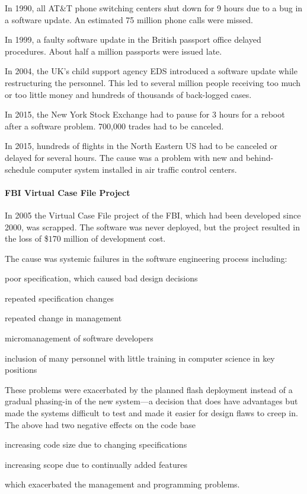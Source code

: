 In 1990, all AT\&T phone switching centers shut down for 9 hours due to a bug in a software update.
An estimated 75 million phone calls were missed.

In 1999, a faulty software update in the British passport office delayed procedures.
About half a million passports were issued late.

In 2004, the UK's child support agency EDS introduced a software update while restructuring the personnel.
This led to several million people receiving too much or too little money and hundreds of thousands of back-logged cases.

In 2015, the New York Stock Exchange had to pause for $3$ hours for a reboot after a software problem.
700,000 trades had to be canceled.

In 2015, hundreds of flights in the North Eastern US had to be canceled or delayed for several hours.
The cause was a problem with new and behind-schedule computer system installed in air traffic control centers.

\paragraph{FBI Virtual Case File Project}
In 2005 the Virtual Case File project of the FBI, which had been developed since 2000, was scrapped.
The software was never deployed, but the project resulted in the loss of \$$170$ million of development cost.

The cause was systemic failures in the software engineering process including:
\begin{compactitem}
 \item poor specification, which caused bad design decisions
 \item repeated specification changes
 \item repeated change in management
 \item micromanagement of software developers
 \item inclusion of many personnel with little training in computer science in key positions
\end{compactitem}
These problems were exacerbated by the planned flash deployment instead of a gradual phasing-in of the new system---a decision that does have advantages but made the systems difficult to test and made it easier for design flaws to creep in.
The above had two negative effects on the code base
\begin{compactitem}
 \item increasing code size due to changing specifications
 \item increasing scope due to continually added features
\end{compactitem}
which exacerbated the management and programming problems.

